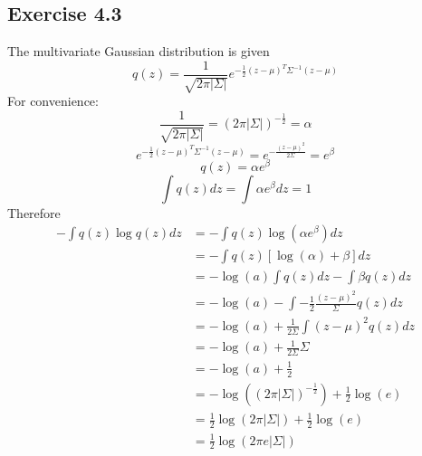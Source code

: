 \documentclass[fleqn]{article}
\begin{document}
\subsection*{Exercise 4.3}
The multivariate Gaussian distribution is given
\begin{equation}
    q(z) = \frac{1}{\sqrt{2\pi|\Sigma|}} e^{-\frac{1}{2}(z - \mu)^{T}\Sigma^{-1}(z - \mu)}
\end{equation}
For convenience:
\begin{equation}
    \frac{1}{\sqrt{2 \pi | \Sigma |}} = (2 \pi |\Sigma|)^{-\frac{1}{2}} =  \alpha
\end{equation}
\begin{equation}
    e^{-\frac{1}{2}(z - \mu)^{T}\Sigma^{-1}(z - \mu)} =
    e^{-\frac{(z - \mu)^2}{2 \Sigma}} =
    e^{\beta}
\end{equation}
\begin{equation}
    q(z) = \alpha e^{\beta}
\end{equation}
\begin{equation}
    \int q(z) dz = \int \alpha e^{\beta} dz = 1
\end{equation}
Therefore
\begin{equation}
    \begin{split}
        - \int q(z) \log q(z) dz &= - \int q(z) \log \left ( \alpha e^{\beta} \right ) dz \\
        & = - \int q(z) \left [ \log(\alpha) + \beta \right ] dz \\
        & = -  \log(a) \int q(z) dz - \int \beta q(z) dz \\
        & = - \log (a) - \int - \frac{1}{2} \frac{(z-\mu)^2}{\Sigma} q(z) dz \\
        & = - \log (a) + \frac{1}{2 \Sigma } \int (z-\mu)^2 q(z) dz \\
        & = - \log (a) + \frac{1}{2 \Sigma } \Sigma \\
        & = - \log (a) + \frac{1}{2} \\
        & = - \log \left( (2 \pi |\Sigma|)^{-\frac{1}{2}} \right) + \frac{1}{2} \log(e) \\
        & = \frac{1}{2} \log \left( 2 \pi |\Sigma| \right) + \frac{1}{2} \log(e) \\
        & = \frac{1}{2} \log \left( 2 \pi e |\Sigma| \right)\\
    \end{split}
\end{equation}
\end{document}
